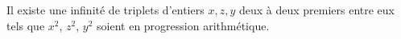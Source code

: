 Il existe une infinité de triplets d'entiers $x, z, y$ deux à deux premiers entre eux tels que $x^2$, $z^2$, $y^2$ soient en progression arithmétique.
